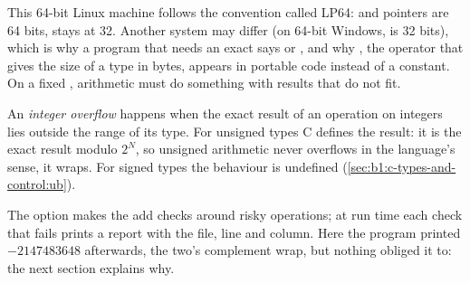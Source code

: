 \label{lst:b1:c-types-and-control:sizes}

\label{out:b1:c-types-and-control:sizes}

This 64-bit Linux machine follows the convention called LP64:  and pointers are 64 bits, 
stays at 32. Another system may differ (on 64-bit Windows,  is 32 bits), which is why a program that
needs an exact  says  or , and why , the operator that gives the
size of a type in bytes, appears in portable code instead of a constant. On a fixed , arithmetic must do
something with results that do not fit.

\begin{definition}\label{def:b1:c-types-and-control:overflow}
An \emph{integer overflow} happens when the exact result of an operation on integers lies
outside the range of its type. For unsigned types C defines the result: it is the exact result modulo $2^N$, so
unsigned arithmetic never overflows in the language's sense, it wraps. For signed types the behaviour is
undefined (\cref{sec:b1:c-types-and-control:ub}).
\end{definition}



\label{lst:b1:c-types-and-control:overflow}

\label{out:b1:c-types-and-control:overflow}

The option  makes the  add checks around risky operations; at run time each
check that fails prints a report with the file, line and column. Here the program printed $-2147483648$ afterwards,
the two's complement wrap, but nothing obliged it to: the next section explains why.

